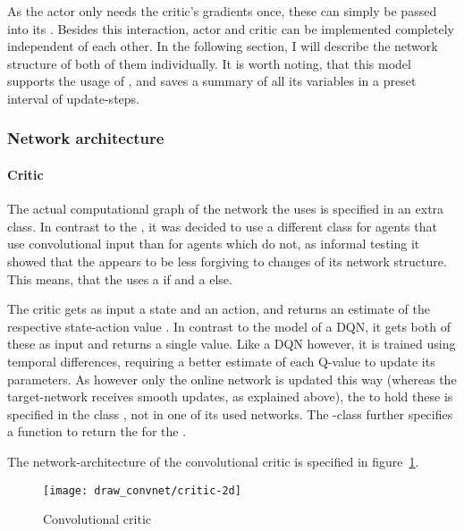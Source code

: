 As the actor only needs the critic's gradients once, these can simply be passed into its . Besides this interaction, actor and critic can be implemented completely independent of each other. In the following section, I will describe the network structure of both of them individually. It is worth noting, that this model supports the usage of , and saves a summary of all its variables in a preset interval of update-steps.

\subsubsection{Network architecture}

\paragraph{Critic}

The actual computational graph of the network the  uses is specified in an extra class. In contrast to the , it was decided to use a different class for agents that use convolutional input than for agents which do not, as informal testing it showed that the  appears to be less forgiving to changes of its network structure. This means, that the  uses a  if  and a  else.

The critic gets as input a state and an action, and returns an estimate of the respective state-action value . In contrast to the model of a DQN, it gets both of these as input and returns a single value. Like a DQN however, it is trained using temporal differences, requiring a better estimate of each Q-value to update its parameters. As however only the online network is updated this way (whereas the target-network receives smooth updates, as explained above), the  to hold these is specified in the class , not in one of its used networks. The -class further specifies a function to return the  for the .

The network-architecture of the convolutional critic is specified in figure~\ref{fig:2dcrit}. 

\begin{figure}[h]
	\centering 
	\texttt{[image: draw\_convnet/critic-2d]}
	\caption{Convolutional critic}
	\label{fig:2dcrit}
\end{figure}


